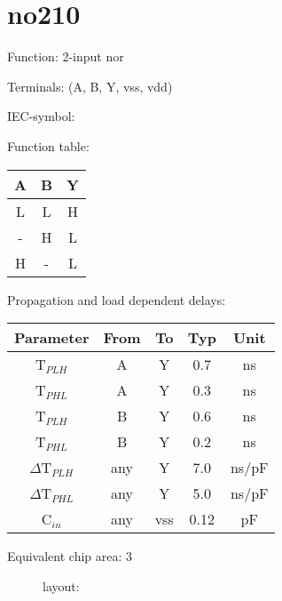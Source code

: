 \section{no210}

Function: 2-input nor

Terminals: (A, B, Y, vss, vdd)


IEC-symbol:
\begin{figure}[bth]
\end{figure}

Function table:
\begin{table}[bth]
\begin{tabular}{|c|c||c|}
\hline
A	&B	&Y\\
\hline
L	&L	&H\\
-	&H	&L\\
H	&-	&L\\
\hline
\end{tabular}
\vspace{1cm}

Propagation and load dependent delays:\\

\begin{tabular}{|c|c|c|c|c|}
\hline
Parameter               &From            &To   &Typ    &Unit\\
\hline
T$_{PLH}$               &A     		&Y      &0.7    &ns\\
T$_{PHL}$               &A    		&Y      &0.3    &ns\\
T$_{PLH}$               &B     		&Y      &0.6    &ns\\
T$_{PHL}$               &B    		&Y      &0.2    &ns\\
\hline
$\Delta$T$_{PLH}$       &any          	&Y      &7.0    &ns/pF\\
$\Delta$T$_{PHL}$       &any           	&Y      &5.0    &ns/pF\\
\hline
C$_{in}$                &any	    	&vss    &0.12   &pF\\
\hline
\end{tabular}
\end{table}

Equivalent chip area: 3






\begin{figure}[bth]
layout:\\

\end{figure}


\clearpage
